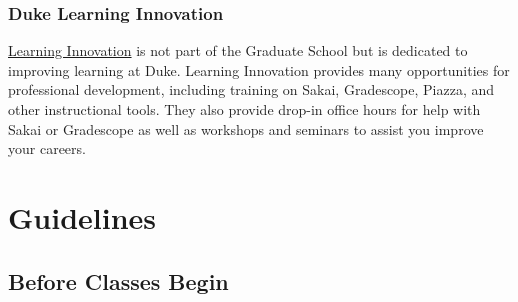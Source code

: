 \documentclass[
]{article}
\begin{document}
\hypertarget{duke-learning-innovation}{%
\subsubsection{Duke Learning Innovation}\label{duke-learning-innovation}}

\href{https://learninginnovation.duke.edu}{Learning Innovation} is not part of the Graduate School but is dedicated to improving learning at Duke. Learning Innovation provides many opportunities for professional development, including training on Sakai, Gradescope, Piazza, and other instructional tools. They also provide drop-in office hours for help with Sakai or Gradescope as well as workshops and seminars to assist you improve your careers.

\hypertarget{guidelines}{%
\section{Guidelines}\label{guidelines}}

\hypertarget{before-classes-begin}{%
\subsection{Before Classes Begin}\label{before-classes-begin}}
\end{document}
